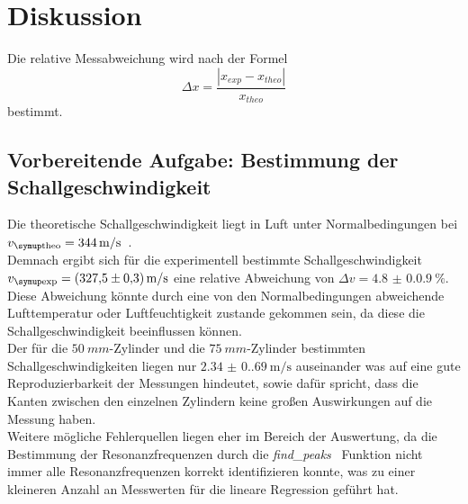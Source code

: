 \section{Diskussion}
\label{sec:Diskussion}

Die relative Messabweichung wird nach der Formel 
\begin{equation}
    \Delta x =   \frac{ \left| x_{exp} - x_{theo} \right|   }{x_{theo}}  
    \label{eq:abweichung}
\end{equation}
bestimmt.

\subsection{Vorbereitende Aufgabe: Bestimmung der Schallgeschwindigkeit}

Die theoretische Schallgeschwindigkeit liegt in Luft unter Normalbedingungen bei $v_\T{theo} = \qty{344}{\meter\per\second}$~\cite{haupl_einfuhrung_2013}. \\
Demnach ergibt sich für die experimentell bestimmte Schallgeschwindigkeit $v_\T{exp} = \qty{327.5(0.3)}{\meter\per\second}$ eine relative Abweichung von $\Delta v = \qty{4.8(0.09)}{\percent}$. \\
Diese Abweichung könnte durch eine von den Normalbedingungen abweichende Lufttemperatur oder Luftfeuchtigkeit zustande gekommen sein, da diese die Schallgeschwindigkeit beeinflussen können. \\
Der für die $\qty{50}{mm}$-Zylinder und die $\qty{75}{mm}$-Zylinder bestimmten Schallgeschwindigkeiten liegen nur $\qty{2.34(0.69)}{\meter\per\second}$ auseinander was auf eine gute Reproduzierbarkeit der Messungen hindeutet, sowie dafür spricht, dass die Kanten zwischen den einzelnen Zylindern keine großen Auswirkungen auf die Messung haben. \\
Weitere mögliche Fehlerquellen liegen eher im Bereich der Auswertung, da die Bestimmung der Resonanzfrequenzen durch die \textit{find\_peaks}~\cite{scipy} Funktion nicht immer alle Resonanzfrequenzen korrekt identifizieren konnte, was zu einer kleineren Anzahl an Messwerten für die lineare Regression geführt hat.

